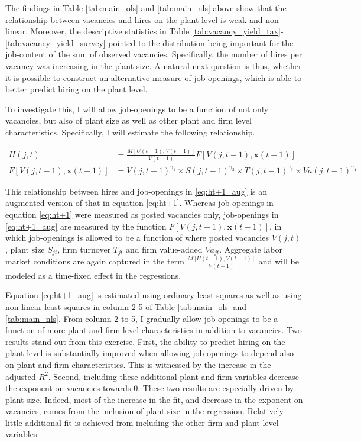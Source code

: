 The findings in Table \ref{tab:main_ols} and \ref{tab:main_nls} above show that the relationship between vacancies and hires on the plant level is weak and non-linear. Moreover, the descriptive statistics in Table \ref{tab:vacancy_yield_tax}-\ref{tab:vacancy_yield_survey} pointed to the distribution being important for the job-content of the sum of observed vacancies. Specifically, the number of hires per vacancy was increasing in the plant size. A natural next question is thus, whether it is possible to construct an alternative measure of job-openings, which is able to better predict hiring on the plant level. 

To investigate this, I will allow job-openings to be a function of not only vacancies, but also of plant size as well as other plant and firm level characteristics. Specifically, I will estimate the following relationship. 

{\scriptsize\begin{align}
H(j,t)&=\frac{M\left[U(t-1), V(t-1)\right]}{V(t-1)} F\left[ V(j,t-1), \mathbf{x}(t-1) \right] 
\label{eq:ht+1_aug} \\
F\left[V(j,t-1),\mathbf{x}(t-1)\right]&=V(j,t-1)^{\gamma_1}  \times  S(j,t-1)^{\gamma_2} \times T(j,t-1)^{\gamma_3} \times  Va(j,t-1)^{\gamma_4} \nonumber
\end{align}}

This relationship between hires and job-openings in \eqref{eq:ht+1_aug} is an augmented version of that in equation \eqref{eq:ht+1}. Whereas job-openings in equation \eqref{eq:ht+1} were measured as posted vacancies only, job-openings in \eqref{eq:ht+1_aug} are measured by the function $F\left[ V(j,t-1), \mathbf{x}(t-1) \right]$, in which job-openings is allowed to be a function of where posted vacancies $V(j,t)$, plant size  $S_{jt}$, firm turnover $T_{jt}$ and firm value-added  $Va_{jt}$. Aggregate labor market conditions are again captured in the term $\frac{M\left[U(t-1), V(t-1)\right]}{V(t-1)}$ and will be modeled as a time-fixed effect in the regressions.

Equation \eqref{eq:ht+1_aug} is estimated using ordinary least squares as well as using non-linear least squares in column 2-5 of Table \ref{tab:main_ols} and \ref{tab:main_nls}. From column 2 to 5, I gradually allow job-openings to be a function of more plant and firm level characteristics in addition to vacancies. Two results stand out from this exercise. First, the ability to predict hiring on the plant level is substantially improved when allowing job-openings to depend also on plant and firm characteristics. This is witnessed by the increase in the adjusted $R^2$. Second, including these additional plant and firm variables decrease the exponent on vacancies towards $0$. These two results are especially driven by plant size. Indeed, most of the increase in the fit, and decrease in the exponent on vacancies, comes from the inclusion of plant size in the regression. Relatively little additional fit is achieved from including the other firm and plant level variables. 

